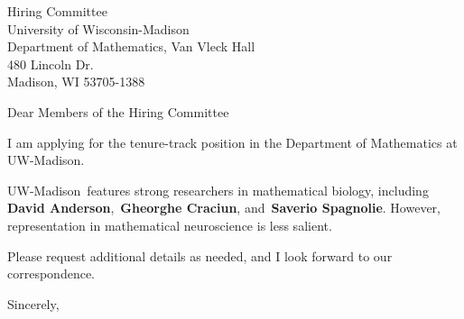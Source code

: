 




	
	
	\def\School{UW-Madison}
	
	\begin{letter}
		{Hiring Committee\\
			University of Wisconsin-Madison\\
			Department of Mathematics, Van Vleck Hall\\
			480 Lincoln Dr.\\
			Madison, WI 53705-1388
			
		}
		
		\opening{Dear Members of the Hiring Committee}
		
		
		I am applying for the tenure-track position in the Department of Mathematics at \School. 
		
		
		
		\School~features strong researchers in mathematical biology, including \textbf{David Anderson}, \textbf{Gheorghe Craciun}, and \textbf{Saverio Spagnolie}. However, representation in mathematical neuroscience is less salient. 
		
		
		
		
		
		Please request additional details as needed, and I look forward to our correspondence.
		
		\closing{Sincerely,}
	\end{letter}
